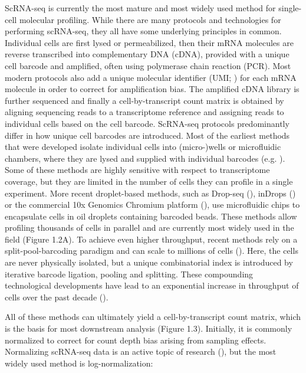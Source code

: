 ScRNA-seq is currently the most mature and most widely used method for single-cell molecular profiling. While there are many protocols and technologies for performing scRNA-seq, they all have some underlying principles in common. Individual cells are first lysed or permeabilized, then their mRNA molecules are reverse transcribed into complementary DNA (cDNA), provided with a unique cell barcode and amplified, often using polymerase chain reaction (PCR). Most modern protocols also add a unique molecular identifier (UMI; \cite{islam_quantitative_2014}) for each mRNA molecule in order to correct for amplification bias. The amplified cDNA library is further sequenced and finally a cell-by-transcript count matrix is obtained by aligning sequencing reads to a transcriptome reference and assigning reads to individual cells based on the cell barcode. ScRNA-seq protocols predominantly differ in how unique cell barcodes are introduced. Most of the earliest methods that were developed isolate individual cells into (micro-)wells or microfluidic chambers, where they are lysed and supplied with individual barcodes (e.g. \cite{picelli_smart-seq2_2013,shalek_single-cell_2014,jaitin_massively_2014,treutlein_reconstructing_2014}). Some of these methods are highly sensitive with respect to transcriptome coverage, but they are limited in the number of cells they can profile in a single experiment. More recent droplet-based methods, such as Drop-seq (\cite{macosko_highly_2015}), inDrops (\cite{klein_droplet_2015}) or the commercial 10x Genomics Chromium platform (\cite{zheng_massively_2017}), use microfluidic chips to encapsulate cells in oil droplets containing barcoded beads. These methods allow profiling thousands of cells in parallel and are currently most widely used in the field (Figure 1.2A). To achieve even higher throughput, recent methods rely on a split-pool-barcoding paradigm and can scale to millions of cells (\cite{rosenberg_single-cell_2018,yin_high-throughput_2019,cao_comprehensive_2017}). Here, the cells are never physically isolated, but a unique combinatorial index is introduced by iterative barcode ligation, pooling and splitting. These compounding technological developments have lead to an exponential increase in throughput of cells over the past decade (\cite{svensson_exponential_2018}).

All of these methods can ultimately yield a cell-by-transcript count matrix, which is the basis for most downstream analysis (Figure 1.3). Initially, it is commonly normalized to correct for count depth bias arising from sampling effects. Normalizing scRNA-seq data is an active topic of research (\cite{lause_analytic_2021,hafemeister_normalization_2019,townes_feature_2019,vallejos_normalizing_2017}), but the most widely used method is log-normalization:

